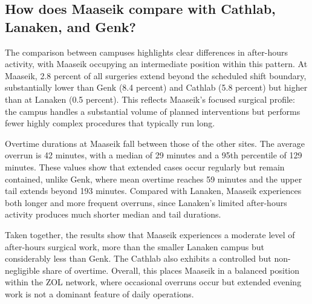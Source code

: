 \documentclass[
]{article}
\begin{document}
\subsection{How does Maaseik compare with Cathlab, Lanaken, and
Genk?}\label{how-does-maaseik-compare-with-cathlab-lanaken-and-genk}

The comparison between campuses highlights clear differences in
after-hours activity, with Maaseik occupying an intermediate position
within this pattern. At Maaseik, 2.8 percent of all surgeries extend
beyond the scheduled shift boundary, substantially lower than Genk (8.4
percent) and Cathlab (5.8 percent) but higher than at Lanaken (0.5
percent). This reflects Maaseik's focused surgical profile: the campus
handles a substantial volume of planned interventions but performs fewer
highly complex procedures that typically run long.

Overtime durations at Maaseik fall between those of the other sites. The
average overrun is 42 minutes, with a median of 29 minutes and a 95th
percentile of 129 minutes. These values show that extended cases occur
regularly but remain contained, unlike Genk, where mean overtime reaches
59 minutes and the upper tail extends beyond 193 minutes. Compared with
Lanaken, Maaseik experiences both longer and more frequent overruns,
since Lanaken's limited after-hours activity produces much shorter
median and tail durations.

Taken together, the results show that Maaseik experiences a moderate
level of after-hours surgical work, more than the smaller Lanaken campus
but considerably less than Genk. The Cathlab also exhibits a controlled
but non-negligible share of overtime. Overall, this places Maaseik in a
balanced position within the ZOL network, where occasional overruns
occur but extended evening work is not a dominant feature of daily
operations.
\end{document}
